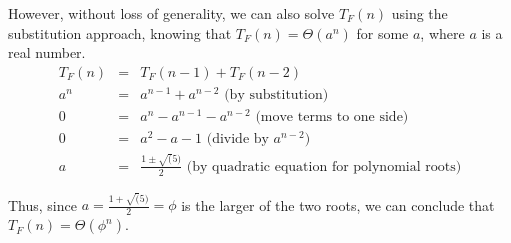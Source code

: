 \documentclass[11pt]{article}
\begin{document}
\begin{sol}
However, without loss of generality, we can also solve $T_{F}(n)$ using the substitution approach, knowing that $T_{F}(n) = \Theta(a^{n})$ for some $a$, where $a$ is a real number.
\begin{eqnarray*}
T_{F}(n) &=& T_{F}(n-1) + T_{F}(n-2) \\
a^{n} &=& a^{n-1} + a^{n-2} \text{ (by substitution)}\\
0 &=& a^{n} - a^{n-1} - a^{n-2}  \text{ (move terms to one side)}\\
0 &=& a^{2} - a - 1  \text{ (divide by $a^{n-2}$)}\\
a &=& \frac{1 \pm \sqrt(5)}{2} \text{ (by quadratic equation for polynomial roots)}
\end{eqnarray*}

Thus, since $a = \frac{1 + \sqrt(5)}{2} = \phi$ is the larger of the two roots, we can conclude that $T_{F}(n) = \Theta(\phi^{n})$.

\end{sol}
\end{document}
